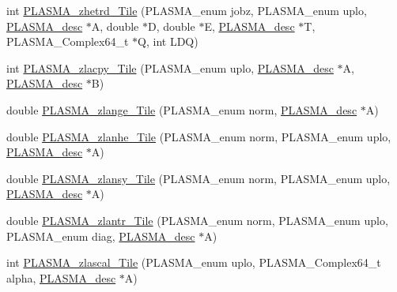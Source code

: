 \begin{DoxyCompactItemize}
\item 
int \hyperlink{group__PLASMA__Complex64__t__Tile_gafced4fe39f5fa98ab1c9b8d857e2b7c4_gafced4fe39f5fa98ab1c9b8d857e2b7c4}{P\+L\+A\+S\+M\+A\+\_\+zhetrd\+\_\+\+Tile} (P\+L\+A\+S\+M\+A\+\_\+enum jobz, P\+L\+A\+S\+M\+A\+\_\+enum uplo, \hyperlink{structplasma__desc__t}{P\+L\+A\+S\+M\+A\+\_\+desc} $\ast$A, double $\ast$D, double $\ast$E, \hyperlink{structplasma__desc__t}{P\+L\+A\+S\+M\+A\+\_\+desc} $\ast$T, P\+L\+A\+S\+M\+A\+\_\+\+Complex64\+\_\+t $\ast$Q, int L\+D\+Q)
\item 
int \hyperlink{group__PLASMA__Complex64__t__Tile_ga59a20a10bc1d75d0a51db239183d19fb_ga59a20a10bc1d75d0a51db239183d19fb}{P\+L\+A\+S\+M\+A\+\_\+zlacpy\+\_\+\+Tile} (P\+L\+A\+S\+M\+A\+\_\+enum uplo, \hyperlink{structplasma__desc__t}{P\+L\+A\+S\+M\+A\+\_\+desc} $\ast$A, \hyperlink{structplasma__desc__t}{P\+L\+A\+S\+M\+A\+\_\+desc} $\ast$B)
\item 
double \hyperlink{group__PLASMA__Complex64__t__Tile_ga140ea0ffbeb5b37b54ec8e4bace4ce0e_ga140ea0ffbeb5b37b54ec8e4bace4ce0e}{P\+L\+A\+S\+M\+A\+\_\+zlange\+\_\+\+Tile} (P\+L\+A\+S\+M\+A\+\_\+enum norm, \hyperlink{structplasma__desc__t}{P\+L\+A\+S\+M\+A\+\_\+desc} $\ast$A)
\item 
double \hyperlink{group__PLASMA__Complex64__t__Tile_ga98a73c942c61d82f486b7ec17d16446b_ga98a73c942c61d82f486b7ec17d16446b}{P\+L\+A\+S\+M\+A\+\_\+zlanhe\+\_\+\+Tile} (P\+L\+A\+S\+M\+A\+\_\+enum norm, P\+L\+A\+S\+M\+A\+\_\+enum uplo, \hyperlink{structplasma__desc__t}{P\+L\+A\+S\+M\+A\+\_\+desc} $\ast$A)
\item 
double \hyperlink{group__PLASMA__Complex64__t__Tile_ga038b70c300d89be07a603d270710c142_ga038b70c300d89be07a603d270710c142}{P\+L\+A\+S\+M\+A\+\_\+zlansy\+\_\+\+Tile} (P\+L\+A\+S\+M\+A\+\_\+enum norm, P\+L\+A\+S\+M\+A\+\_\+enum uplo, \hyperlink{structplasma__desc__t}{P\+L\+A\+S\+M\+A\+\_\+desc} $\ast$A)
\item 
double \hyperlink{group__PLASMA__Complex64__t__Tile_gac7af0feafd4ea8efb868e76f3bed7fff_gac7af0feafd4ea8efb868e76f3bed7fff}{P\+L\+A\+S\+M\+A\+\_\+zlantr\+\_\+\+Tile} (P\+L\+A\+S\+M\+A\+\_\+enum norm, P\+L\+A\+S\+M\+A\+\_\+enum uplo, P\+L\+A\+S\+M\+A\+\_\+enum diag, \hyperlink{structplasma__desc__t}{P\+L\+A\+S\+M\+A\+\_\+desc} $\ast$A)
\item 
int \hyperlink{group__PLASMA__Complex64__t__Tile_gac09c94bc28f9459be3b5a6018253a888_gac09c94bc28f9459be3b5a6018253a888}{P\+L\+A\+S\+M\+A\+\_\+zlascal\+\_\+\+Tile} (P\+L\+A\+S\+M\+A\+\_\+enum uplo, P\+L\+A\+S\+M\+A\+\_\+\+Complex64\+\_\+t alpha, \hyperlink{structplasma__desc__t}{P\+L\+A\+S\+M\+A\+\_\+desc} $\ast$A)

\end{DoxyCompactItemize}
